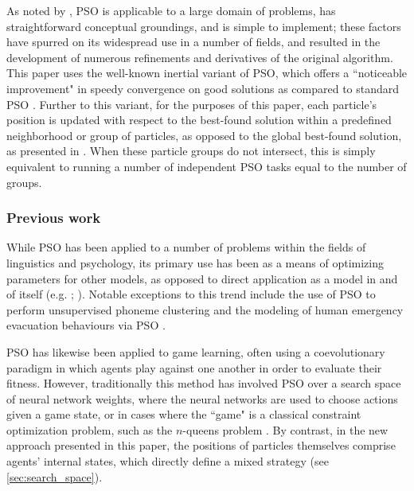\documentclass[12pt,a4paper]{article}
\begin{document}
As noted by \citet*{yang2014}, PSO is applicable to a large domain of problems, has straightforward conceptual groundings, and is simple to implement; these factors have spurred on its widespread use in a number of fields, and resulted in the development of numerous refinements and derivatives of the original algorithm. This paper uses the well-known inertial variant of PSO, which offers a ``noticeable improvement" in speedy convergence on good solutions as compared to standard PSO \citep{yang2014}. Further to this variant, for the purposes of this paper, each particle's position is updated with respect to the best-found solution within a predefined neighborhood or group of particles, as opposed to the global best-found solution, as presented in \citet*{solnon2010}. When these particle groups do not intersect, this is simply equivalent to running a number of independent PSO tasks equal to the number of groups.



\subsubsection{Previous work}
\label{sec:pso_prev_work}

While PSO has been applied to a number of problems within the fields of linguistics and psychology, its primary use has been as a means of optimizing parameters for other models, as opposed to direct application as a model in and of itself (e.g. \citeauthor{chatterjee2005} \citeyear{chatterjee2005}; \citeauthor{mehdad2009} \citeyear{mehdad2009}). Notable exceptions to this trend include the use of PSO to perform unsupervised phoneme clustering \citep{ahmadi2007} and the modeling of human emergency evacuation behaviours via PSO \citep{cheng2008}.

PSO has likewise been applied to game learning, often using a coevolutionary paradigm in which agents play against one another in order to evaluate their fitness. However, traditionally this method has involved PSO over a search space of neural network weights, where the neural networks are used to choose actions given a game state, or in cases where the ``game" is a classical constraint optimization problem, such as the $n$-queens problem \citep[p.~349-351]{engelbrecht2005}. By contrast, in the new approach presented in this paper, the positions of particles themselves comprise agents' internal states, which directly define a mixed strategy (see \autoref{sec:search_space}).  
\end{document}
